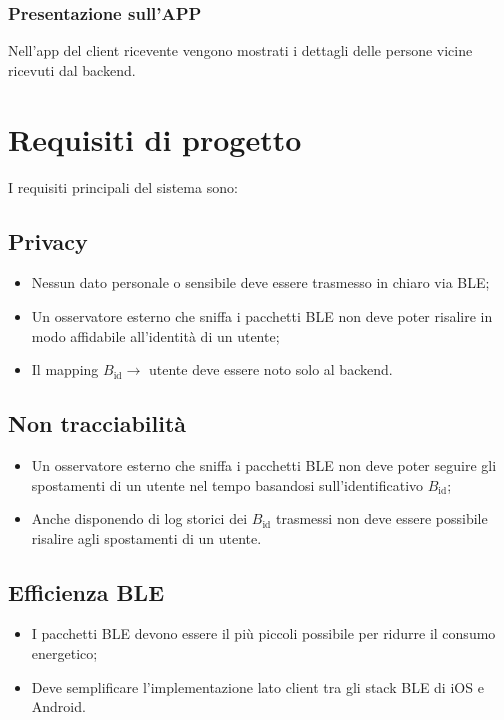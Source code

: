 \documentclass[a4paper,11pt]{article}
\begin{document}
\subsubsection{Presentazione sull'APP}
Nell'app del client ricevente vengono mostrati i dettagli delle persone vicine ricevuti dal backend.

\section{Requisiti di progetto}

I requisiti principali del sistema sono:

\subsection{Privacy}
\begin{itemize}
  \item Nessun dato personale o sensibile deve essere trasmesso in chiaro via BLE;
  \item Un osservatore esterno che sniffa i pacchetti BLE non deve poter risalire in modo affidabile all'identità di un utente;
  \item Il mapping \(B_{\text{id}} \rightarrow\) utente deve essere noto solo al backend.
\end{itemize}


\subsection{Non tracciabilità}
\begin{itemize}
  \item Un osservatore esterno che sniffa i pacchetti BLE non deve poter seguire gli spostamenti di un utente nel tempo basandosi sull'identificativo \(B_{\text{id}}\);
  \item Anche disponendo di log storici dei \(B_{\text{id}}\) trasmessi non deve essere possibile risalire agli spostamenti di un utente.
\end{itemize}

\subsection{Efficienza BLE}
\begin{itemize}
  \item I pacchetti BLE devono essere il più piccoli possibile per ridurre il consumo energetico;
  \item Deve semplificare l'implementazione lato client tra gli stack BLE di iOS e Android.
\end{itemize}
\end{document}
